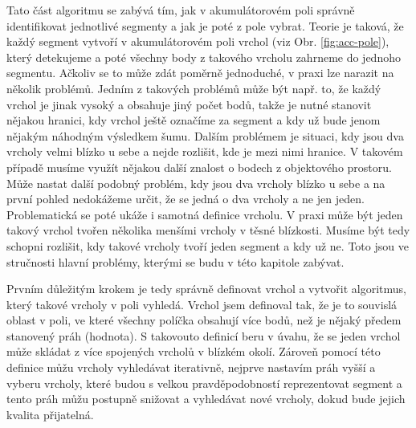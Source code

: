 \documentclass[11pt,twoside,a4paper]{book}
\begin{document}
Tato část algoritmu se zabývá tím, jak v akumulátorovém poli správně identifikovat jednotlivé segmenty a jak je poté z pole vybrat. Teorie je taková, že každý segment vytvoří v akumulátorovém poli vrchol (viz Obr. \ref{fig:acc-pole}), který detekujeme a poté všechny body z takového vrcholu zahrneme do jednoho segmentu. Ačkoliv se to může zdát poměrně jednoduché, v praxi lze narazit na několik problémů. Jedním z takových problémů může být např. to, že každý vrchol je jinak vysoký a obsahuje jiný počet bodů, takže je nutné stanovit nějakou hranici, kdy vrchol ještě označíme za segment a kdy už bude jenom nějakým náhodným výsledkem šumu. Dalším problémem je situaci, kdy jsou dva vrcholy velmi blízko u sebe a nejde rozlišit, kde je mezi nimi hranice. V takovém případě musíme využít nějakou další znalost o bodech z objektového prostoru. Může nastat další podobný problém, kdy jsou dva vrcholy blízko u sebe a na první pohled nedokážeme určit, že se jedná o dva vrcholy a ne jen jeden. Problematická se poté ukáže i samotná definice vrcholu. V praxi může být jeden takový vrchol tvořen několika menšími vrcholy v těsné blízkosti. Musíme být tedy schopni rozlišit, kdy takové vrcholy tvoří jeden segment a kdy už ne. Toto jsou ve stručnosti hlavní problémy, kterými se budu v této kapitole zabývat.

Prvním důležitým krokem je tedy správně definovat vrchol a vytvořit algoritmus, který takové vrcholy v poli vyhledá. Vrchol jsem definoval tak, že je to souvislá oblast v poli, ve které všechny políčka obsahují více bodů, než je nějaký předem stanovený práh (hodnota). S takovouto definicí beru v úvahu, že se jeden vrchol může skládat z více spojených vrcholů v blízkém okolí. Zároveň pomocí této definice můžu vrcholy vyhledávat iterativně, nejprve nastavím práh vyšší a vyberu vrcholy, které budou s velkou pravděpodobností reprezentovat segment a tento práh můžu postupně snižovat a vyhledávat nové vrcholy, dokud bude jejich kvalita přijatelná.
\end{document}
